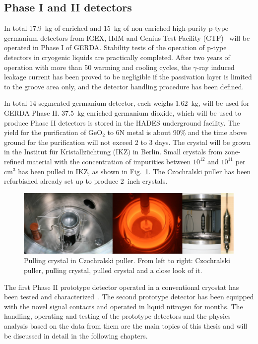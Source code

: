 \subsection{Phase I and II detectors}
\label{sec:gerda:stat3}
In total 17.9~kg of enriched and 15~kg of non-enriched high-purity p-type germanium detectors from IGEX, HdM and Genius Test Facility (GTF)~\cite{Kla02} will be operated in Phase I of GERDA.  Stability tests of the operation of p-type detectors in cryogenic liquids are practically completed.  After two years of operation with more than 50 warming and cooling cycles, the $\gamma$-ray induced leakage current has been proved to be negligible if the passivation layer is limited to the groove area only, and the detector handling procedure has been defined.

In total 14 segmented germanium detector, each weighs 1.62~kg, will be used for GERDA Phase II. 37.5~kg enriched germanium dioxide, which will be used to produce Phase II detectors is stored in the HADES underground facility. The yield for the purification of GeO$_{2}$ to 6N metal is about 90\% and the time above ground for the purification will not exceed 2 to 3 days. The crystal will be grown in the Institut f\"ur Kristallz\"uchtung (IKZ) in Berlin. Small crystals from zone-refined material with the concentration of impurities between $10^{12}$ and $10^{11}$ per cm$^{3}$ has been pulled in IKZ, as shown in Fig.~\ref{fig:pulling}. The Czochralski puller has been refurbished already set up to produce 2~inch crystals.
\begin{figure}[tbhp]
  \centering
  \includegraphics[width=\textwidth]{crystalPulling}
  \caption{Pulling crystal in Czochralski puller. From left to right: Czochralski puller, pulling crystal, pulled crystal and a close look of it.}
  \label{fig:pulling}
\end{figure}

The first Phase II prototype detector operated in a conventional cryostat has been tested and characterized~\cite{Sie07}. The second prototype detector has been equipped with the novel signal contacts and operated in liquid nitrogen for months. The handling, operating and testing of the prototype detectors and the physics analysis based on the data from them are the main topics of this thesis and will be discussed in detail in the following chapters.


